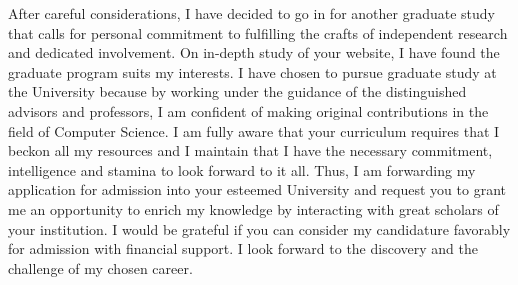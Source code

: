 \documentclass[letterpaper]{article}
\begin{document}
After careful considerations, I have decided to go in for another graduate study that calls for personal commitment to 
fulfilling the crafts of independent research and dedicated involvement.
On in-depth study of your website, I have found the graduate program suits my interests.
I have chosen to pursue graduate study at the University because by working under the guidance of the 
distinguished advisors and professors, I am confident of making original contributions in the field of Computer Science. 
I am fully aware that your curriculum requires that I beckon all my resources and 
I maintain that I have the necessary commitment, intelligence and stamina to look forward to it all. 
Thus, I am forwarding my application for admission into your esteemed University and request you to grant me 
an opportunity to enrich my knowledge by interacting with great scholars of your institution. 
I would be grateful if you can consider my candidature favorably for admission with financial support. 
I look forward to the discovery and the challenge of my chosen career.
\end{document}
